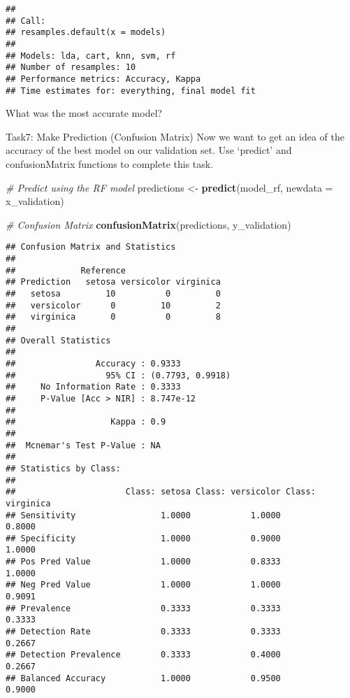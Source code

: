 \documentclass[
]{article}
\newenvironment{Shaded}{\begin{snugshade}}{\end{snugshade}}
\newcommand{\AttributeTok}[1]{\textcolor[rgb]{0.13,0.29,0.53}{#1}}
\newcommand{\CommentTok}[1]{\textcolor[rgb]{0.56,0.35,0.01}{\textit{#1}}}
\newcommand{\FunctionTok}[1]{\textcolor[rgb]{0.13,0.29,0.53}{\textbf{#1}}}
\newcommand{\NormalTok}[1]{#1}
\newcommand{\OtherTok}[1]{\textcolor[rgb]{0.56,0.35,0.01}{#1}}
\begin{document}
\begin{verbatim}
## 
## Call:
## resamples.default(x = models)
## 
## Models: lda, cart, knn, svm, rf 
## Number of resamples: 10 
## Performance metrics: Accuracy, Kappa 
## Time estimates for: everything, final model fit
\end{verbatim}

What was the most accurate model?

Task7: Make Prediction (Confusion Matrix) Now we want to get an idea of
the accuracy of the best model on our validation set. Use `predict' and
confusionMatrix functions to complete this task.

\begin{Shaded}
\begin{Highlighting}[]
\CommentTok{\# Predict using the RF model}
\NormalTok{predictions }\OtherTok{\textless{}{-}} \FunctionTok{predict}\NormalTok{(model\_rf, }\AttributeTok{newdata =}\NormalTok{ x\_validation)}

\CommentTok{\# Confusion Matrix}
\FunctionTok{confusionMatrix}\NormalTok{(predictions, y\_validation)}
\end{Highlighting}
\end{Shaded}

\begin{verbatim}
## Confusion Matrix and Statistics
## 
##             Reference
## Prediction   setosa versicolor virginica
##   setosa         10          0         0
##   versicolor      0         10         2
##   virginica       0          0         8
## 
## Overall Statistics
##                                           
##                Accuracy : 0.9333          
##                  95% CI : (0.7793, 0.9918)
##     No Information Rate : 0.3333          
##     P-Value [Acc > NIR] : 8.747e-12       
##                                           
##                   Kappa : 0.9             
##                                           
##  Mcnemar's Test P-Value : NA              
## 
## Statistics by Class:
## 
##                      Class: setosa Class: versicolor Class: virginica
## Sensitivity                 1.0000            1.0000           0.8000
## Specificity                 1.0000            0.9000           1.0000
## Pos Pred Value              1.0000            0.8333           1.0000
## Neg Pred Value              1.0000            1.0000           0.9091
## Prevalence                  0.3333            0.3333           0.3333
## Detection Rate              0.3333            0.3333           0.2667
## Detection Prevalence        0.3333            0.4000           0.2667
## Balanced Accuracy           1.0000            0.9500           0.9000
\end{verbatim}
\end{document}

